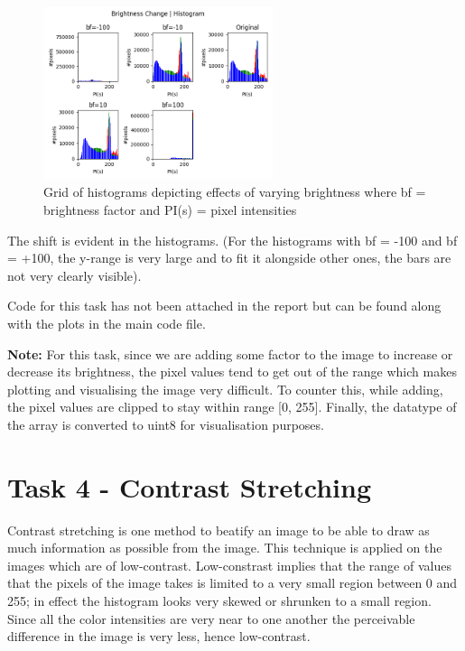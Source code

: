 \documentclass[notitlepage]{report}
\begin{document}
\begin{figure}[htp]
    \centering
    \hypertarget{BF_Hist}{\includegraphics[width = 0.6\textwidth]{BF_Hist.png}}
    \caption{Grid of histograms depicting effects of varying brightness where bf = brightness factor and PI(s) = pixel intensities}
    \label{fig4:sysfig}
\end{figure}

The shift is evident in the histograms.
(For the histograms with bf = -100 and bf = +100, the y-range is very large and to fit it alongside other ones, 
the bars are not very clearly visible).

Code for this task has not been attached in the report but can be found along with the plots in the main code file.

\textbf{Note:} For this task, since we are adding some factor to the image to increase or decrease its brightness, the 
pixel values tend to get out of the range which makes plotting and visualising the image very difficult. To counter this, 
while adding, the pixel values are clipped to stay within range [0, 255]. Finally, the datatype of the array is converted to 
uint8 for visualisation purposes.

\section{Task 4 - Contrast Stretching}
Contrast stretching is one method to beatify an image to be able to draw as much information as possible from the image. This
technique is applied on the images which are of low-contrast. Low-constrast implies that the range of values that the pixels of 
the image takes is limited to a very small region between 0 and 255; in effect the histogram looks very skewed or shrunken to a small
region. Since all the color intensities are very near to one another the perceivable difference in the image is very less, hence low-contrast.
\end{document}
